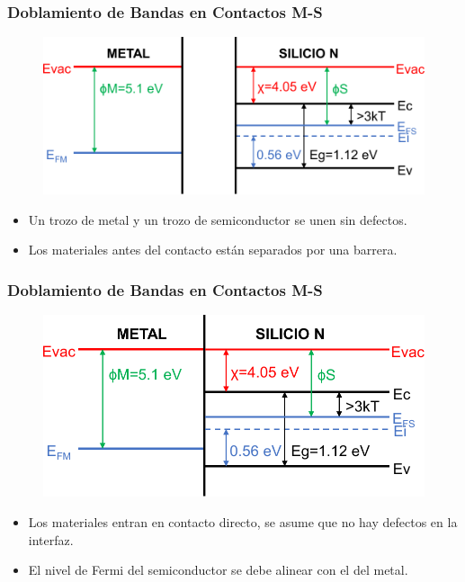 \documentclass[10pt,t,aspectratio=169]{beamer}
\begin{document}
\begin{frame}[t]
    \frametitle{Doblamiento de Bandas en Contactos M-S}

    \begin{figure}[t]
        \includegraphics[scale=0.6]{./figures/contacto-MS-1.pdf}
    \end{figure}

    \begin{itemize}
        \item Un trozo de metal y un trozo de semiconductor se unen sin defectos.
        \item Los materiales antes del contacto están separados por una barrera.
    \end{itemize}
\end{frame}


\begin{frame}[t]
    \frametitle{Doblamiento de Bandas en Contactos M-S}

    \begin{figure}[t]
        \includegraphics[scale=0.6]{./figures/contacto-MS-2.pdf}
    \end{figure}

    \begin{itemize}
        \item Los materiales entran en contacto directo, se asume que no hay defectos en la interfaz.
        \item El nivel de Fermi del semiconductor se debe alinear con el del metal.
    \end{itemize}
\end{frame}
\end{document}
